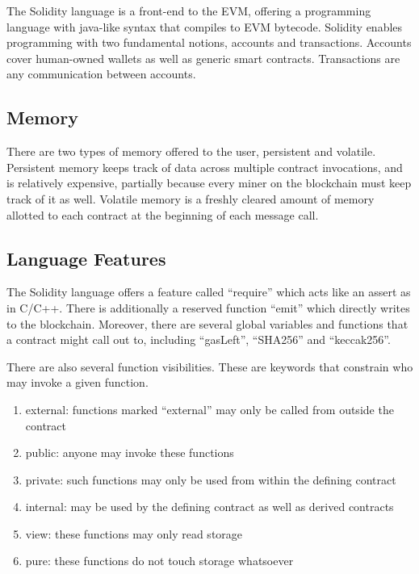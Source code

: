 \documentclass[twoside]{article}
\begin{document}
The Solidity language is a front-end to the EVM, offering a programming language
with java-like syntax that compiles to EVM bytecode.  Solidity enables
programming with two fundamental notions, accounts and transactions.  Accounts
cover human-owned wallets as well as generic smart contracts.  Transactions are
any communication between accounts.

\subsection{Memory}

There are two types of memory offered to the user, persistent and volatile.
Persistent memory keeps track of data across multiple contract invocations, and
is relatively expensive, partially because every miner on the blockchain must
keep track of it as well.  Volatile memory is a freshly cleared amount of memory
allotted to each contract at the beginning of each message call.

\subsection{Language Features}

The Solidity language offers a feature called ``require'' which acts like an
assert as in C/C++.  There is additionally a reserved function ``emit'' which
directly writes to the blockchain.  Moreover, there are several global variables
and functions that a contract might call out to, including ``gasLeft'',
``SHA256'' and ``keccak256''.

There are also several function visibilities.  These are keywords that constrain
who may invoke a given function.  

\begin{enumerate}
\item external: functions marked ``external'' may only be called from outside the contract
\item public: anyone may invoke these functions
\item private: such functions may only be used from within the defining contract
\item internal: may be used by the defining contract as well as derived contracts
\item view: these functions may only read storage
\item pure: these functions do not touch storage whatsoever
\end{enumerate}
\end{document}
